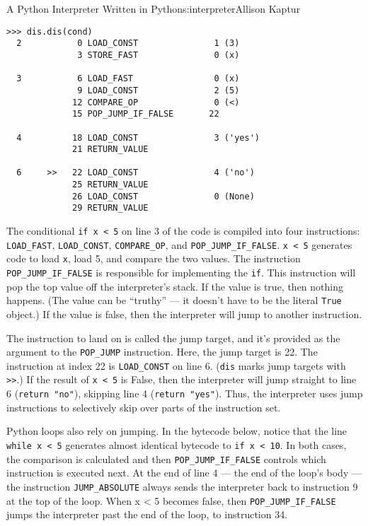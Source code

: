 \begin{aosachapter}{A Python Interpreter Written in Python}{s:interpreter}{Allison Kaptur}
\begin{verbatim}
>>> dis.dis(cond)
  2           0 LOAD_CONST               1 (3)
              3 STORE_FAST               0 (x)

  3           6 LOAD_FAST                0 (x)
              9 LOAD_CONST               2 (5)
             12 COMPARE_OP               0 (<)
             15 POP_JUMP_IF_FALSE       22

  4          18 LOAD_CONST               3 ('yes')
             21 RETURN_VALUE

  6     >>   22 LOAD_CONST               4 ('no')
             25 RETURN_VALUE
             26 LOAD_CONST               0 (None)
             29 RETURN_VALUE
\end{verbatim}

The conditional \texttt{if x \textless{} 5} on line 3 of the code is
compiled into four instructions: \texttt{LOAD\_FAST},
\texttt{LOAD\_CONST}, \texttt{COMPARE\_OP}, and
\texttt{POP\_JUMP\_IF\_FALSE}. \texttt{x \textless{} 5} generates code
to load \texttt{x}, load 5, and compare the two values. The instruction
\texttt{POP\_JUMP\_IF\_FALSE} is responsible for implementing the
\texttt{if}. This instruction will pop the top value off the
interpreter's stack. If the value is true, then nothing happens. (The
value can be ``truthy'' --- it doesn't have to be the literal
\texttt{True} object.) If the value is false, then the interpreter will
jump to another instruction.

The instruction to land on is called the jump target, and it's provided
as the argument to the \texttt{POP\_JUMP} instruction. Here, the jump
target is 22. The instruction at index 22 is \texttt{LOAD\_CONST} on
line 6. (\texttt{dis} marks jump targets with
\texttt{\textgreater{}\textgreater{}}.) If the result of
\texttt{x \textless{} 5} is False, then the interpreter will jump
straight to line 6 (\texttt{return "no"}), skipping line 4
(\texttt{return "yes"}). Thus, the interpreter uses jump instructions to
selectively skip over parts of the instruction set.

Python loops also rely on jumping. In the bytecode below, notice that
the line \texttt{while x \textless{} 5} generates almost identical
bytecode to \texttt{if x \textless{} 10}. In both cases, the comparison
is calculated and then \texttt{POP\_JUMP\_IF\_FALSE} controls which
instruction is executed next. At the end of line 4 --- the end of the
loop's body --- the instruction \texttt{JUMP\_ABSOLUTE} always sends the
interpreter back to instruction 9 at the top of the loop. When x
\textless{} 5 becomes false, then \texttt{POP\_JUMP\_IF\_FALSE} jumps
the interpreter past the end of the loop, to instruction 34.


\end{aosachapter}
